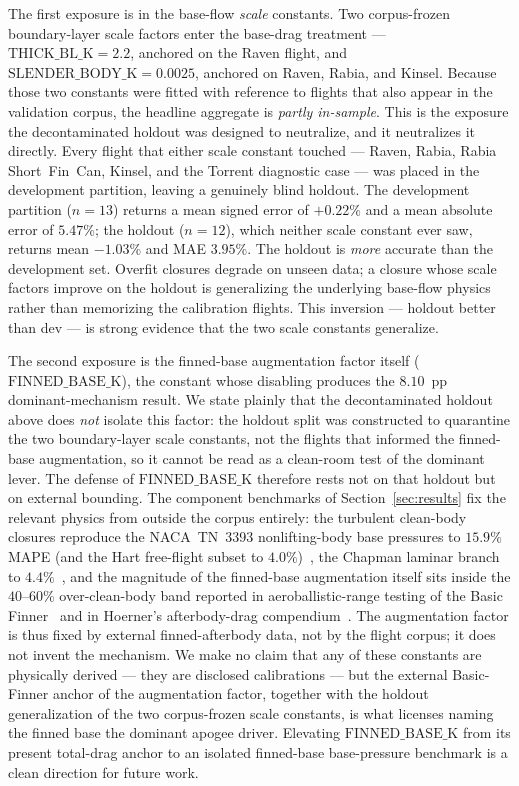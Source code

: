 The first exposure is in the base-flow \emph{scale} constants. Two corpus-frozen
boundary-layer scale factors enter the base-drag treatment ---
$\mathrm{THICK\_BL\_K}=2.2$, anchored on the Raven flight, and
$\mathrm{SLENDER\_BODY\_K}=0.0025$, anchored on Raven, Rabia, and Kinsel. Because
those two constants were fitted with reference to flights that also appear in the
validation corpus, the headline aggregate is \emph{partly in-sample}. This is the
exposure the decontaminated holdout was designed to neutralize, and it neutralizes
it directly. Every flight that either scale constant touched --- Raven, Rabia,
Rabia Short~Fin~Can, Kinsel, and the Torrent diagnostic case --- was placed in the
development partition, leaving a genuinely blind holdout. The development partition
($n=13$) returns a mean signed error of $+0.22\%$ and a mean absolute error of
$5.47\%$; the holdout ($n=12$), which neither scale constant ever saw, returns mean
$-1.03\%$ and MAE $3.95\%$. The holdout is \emph{more} accurate than the
development set. Overfit closures degrade on unseen data; a closure whose scale
factors improve on the holdout is generalizing the underlying base-flow physics
rather than memorizing the calibration flights. This inversion --- holdout better
than dev --- is strong evidence that the two scale constants generalize.

The second exposure is the finned-base augmentation factor itself
($\mathrm{FINNED\_BASE\_K}$), the constant whose disabling produces the $8.10$~pp
dominant-mechanism result. We state plainly that the decontaminated holdout above
does \emph{not} isolate this factor: the holdout split was constructed to quarantine
the two boundary-layer scale constants, not the flights that informed the
finned-base augmentation, so it cannot be read as a clean-room test of the dominant
lever. The defense of $\mathrm{FINNED\_BASE\_K}$ therefore rests not on that holdout
but on external bounding. The component benchmarks of Section~\ref{sec:results}
fix the relevant physics from outside the corpus entirely: the turbulent clean-body
closures reproduce the NACA~TN~3393 nonlifting-body base pressures to $15.9\%$ MAPE
(and the Hart free-flight subset to $4.0\%$)~\cite{chapman1955}, the Chapman laminar
branch to $4.4\%$~\cite{chapman1955,chapman1950}, and the magnitude of the
finned-base augmentation itself sits inside the $40$--$60\%$ over-clean-body band
reported in aeroballistic-range testing of the Basic Finner~\cite{dupuis1997} and in
Hoerner's afterbody-drag compendium~\cite{hoerner1965}. The augmentation factor is
thus fixed by external finned-afterbody data, not by the flight corpus; it does not
invent the mechanism. We make no claim that any of these constants are physically
derived --- they are disclosed calibrations --- but the external Basic-Finner anchor
of the augmentation factor, together with the holdout generalization of the two
corpus-frozen scale constants, is what licenses naming the finned base the dominant
apogee driver. Elevating $\mathrm{FINNED\_BASE\_K}$ from its present total-drag
anchor to an isolated finned-base base-pressure benchmark is a clean direction for
future work.

